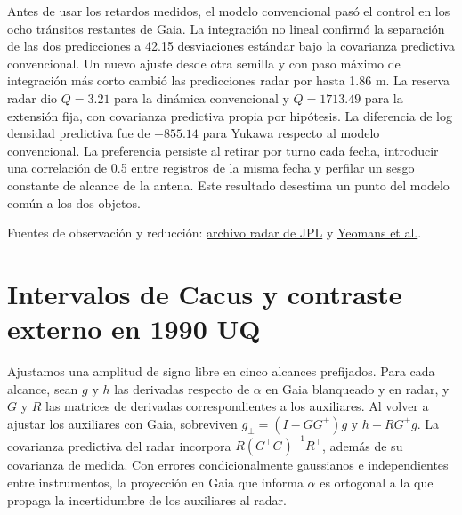 \documentclass[11pt,a4paper]{article}
\begin{document}
Antes de usar los retardos medidos, el modelo convencional pasó el control en los ocho tránsitos restantes de Gaia. La integración no lineal confirmó la separación de las dos predicciones a 42.15 desviaciones estándar bajo la covarianza predictiva convencional. Un nuevo ajuste desde otra semilla y con paso máximo de integración más corto cambió las predicciones radar por hasta 1.86 m. La reserva radar dio $Q=3.21$ para la dinámica convencional y $Q=1713.49$ para la extensión fija, con covarianza predictiva propia por hipótesis. La diferencia de log densidad predictiva fue de $-855.14$ para Yukawa respecto al modelo convencional. La preferencia persiste al retirar por turno cada fecha, introducir una correlación de 0.5 entre registros de la misma fecha y perfilar un sesgo constante de alcance de la antena. Este resultado desestima un punto del modelo común a los dos objetos.

\noindent Fuentes de observación y reducción: \href{https://ssd-api.jpl.nasa.gov/doc/sb_radar.html}{archivo radar de JPL} y \href{https://echo.jpl.nasa.gov/asteroids/yeomans%2B1992AJ_orbits.pdf}{Yeomans et al.}.

\section{Intervalos de Cacus y contraste externo en 1990 UQ}
Ajustamos una amplitud de signo libre en cinco alcances prefijados. Para cada alcance, sean $g$ y $h$ las derivadas respecto de $\alpha$ en Gaia blanqueado y en radar, y $G$ y $R$ las matrices de derivadas correspondientes a los auxiliares. Al volver a ajustar los auxiliares con Gaia, sobreviven $g_\perp=(I-GG^+)g$ y $h-RG^+g$. La covarianza predictiva del radar incorpora $R(G^\top G)^{-1}R^\top$, además de su covarianza de medida. Con errores condicionalmente gaussianos e independientes entre instrumentos, la proyección en Gaia que informa $\alpha$ es ortogonal a la que propaga la incertidumbre de los auxiliares al radar.
\end{document}
